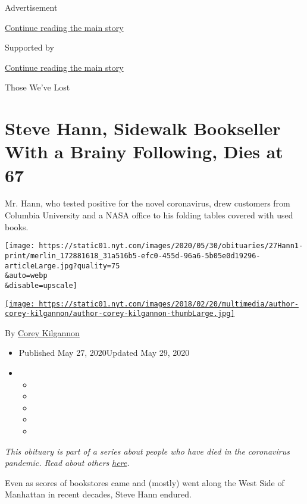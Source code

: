 Advertisement

\protect\hyperlink{after-top}{Continue reading the main story}

Supported by

\protect\hyperlink{after-sponsor}{Continue reading the main story}

Those We've Lost

\hypertarget{steve-hann-sidewalk-bookseller-with-a-brainy-following-dies-at-67}{%
\section{Steve Hann, Sidewalk Bookseller With a Brainy Following, Dies
at
67}\label{steve-hann-sidewalk-bookseller-with-a-brainy-following-dies-at-67}}

Mr. Hann, who tested positive for the novel coronavirus, drew customers
from Columbia University and a NASA office to his folding tables covered
with used books.

\texttt{[image: https://static01.nyt.com/images/2020/05/30/obituaries/27Hann1-print/merlin\_172881618\_31a516b5-efc0-455d-96a6-5b05e0d19296-articleLarge.jpg?quality=75\\\&auto=webp\\\&disable=upscale]}

\href{https://www.nytimes.com/by/corey-kilgannon}{\texttt{[image: https://static01.nyt.com/images/2018/02/20/multimedia/author-corey-kilgannon/author-corey-kilgannon-thumbLarge.jpg]}}

By \href{https://www.nytimes.com/by/corey-kilgannon}{Corey Kilgannon}

\begin{itemize}
\item
  Published May 27, 2020Updated May 29, 2020
\item
  \begin{itemize}
  \item
  \item
  \item
  \item
  \item
  \end{itemize}
\end{itemize}

\emph{This obituary is part of a series about people who have died in
the coronavirus pandemic. Read about others}
\href{https://www.nytimes.com/interactive/2020/obituaries/people-died-coronavirus-obituaries.html}{\emph{here}}\emph{.}

Even as scores of bookstores came and (mostly) went along the West Side
of Manhattan in recent decades, Steve Hann endured.

